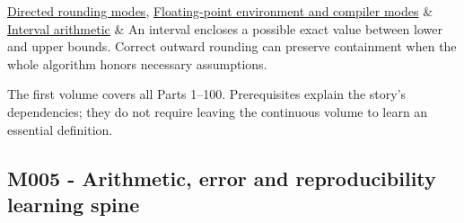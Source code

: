{\begin{longtable}[]
\hyperref[appendix-637d164ae5ca]{Directed rounding modes}, \hyperref[appendix-f11d1a521253]{Floating-point environment and compiler modes} & \hyperref[appendix-1823a14330cb]{Interval arithmetic} & An interval encloses a possible exact value between lower and upper bounds. Correct outward rounding can preserve containment when the whole algorithm honors necessary assumptions. \\
\end{longtable}
}

The first volume covers all Parts 1--100. Prerequisites explain the story's dependencies; they do not require leaving the continuous volume to learn an essential definition.

\subsection{M005 - Arithmetic, error and reproducibility learning spine}\label{appendix-4ad47bdd269a-m005---arithmetic-error-and-reproducibility-learning-spine}

